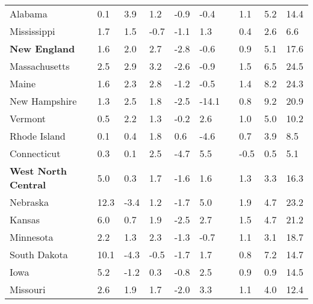 {\begin{tabular}{p{29mm} R{8.5mm} R{8.5mm} R{8.5mm} R{8.5mm} 
             R{8.5mm} p{0mm} R{11mm} R{11mm} R{12mm} }
\hspace{3mm}  Alabama  & 0.1 & 3.9 & 1.2 & -0.9 & -0.4 &  & 1.1 & 5.2 & 14.4 \\
\hspace{3mm}  Mississippi  & 1.7 & 1.5 & -0.7 & -1.1 & 1.3 &  & 0.4 & 2.6 & 6.6 \\
\hspace{1mm} \textbf{New England}  & 1.6 & 2.0 & 2.7 & -2.8 & -0.6 &  & 0.9 & 5.1 & 17.6 \\
\hspace{3mm}  Massachusetts  & 2.5 & 2.9 & 3.2 & -2.6 & -0.9 &  & 1.5 & 6.5 & 24.5 \\
\hspace{3mm}  Maine  & 1.6 & 2.3 & 2.8 & -1.2 & -0.5 &  & 1.4 & 8.2 & 24.3 \\
\hspace{3mm}  New Hampshire  & 1.3 & 2.5 & 1.8 & -2.5 & -14.1 &  & 0.8 & 9.2 & 20.9 \\
\hspace{3mm}  Vermont  & 0.5 & 2.2 & 1.3 & -0.2 & 2.6 &  & 1.0 & 5.0 & 10.2 \\
\hspace{3mm}  Rhode Island  & 0.1 & 0.4 & 1.8 & 0.6 & -4.6 &  & 0.7 & 3.9 & 8.5 \\
\hspace{3mm}  Connecticut  & 0.3 & 0.1 & 2.5 & -4.7 & 5.5 &  & -0.5 & 0.5 & 5.1 \\
\hspace{1mm} \textbf{West North Central}  & 5.0 & 0.3 & 1.7 & -1.6 & 1.6 &  & 1.3 & 3.3 & 16.3 \\
\hspace{3mm}  Nebraska  & 12.3 & -3.4 & 1.2 & -1.7 & 5.0 &  & 1.9 & 4.7 & 23.2 \\
\hspace{3mm}  Kansas  & 6.0 & 0.7 & 1.9 & -2.5 & 2.7 &  & 1.5 & 4.7 & 21.2 \\
\hspace{3mm}  Minnesota  & 2.2 & 1.3 & 2.3 & -1.3 & -0.7 &  & 1.1 & 3.1 & 18.7 \\
\hspace{3mm}  South Dakota  & 10.1 & -4.3 & -0.5 & -1.7 & 1.7 &  & 0.8 & 7.2 & 14.7 \\
\hspace{3mm}  Iowa  & 5.2 & -1.2 & 0.3 & -0.8 & 2.5 &  & 0.9 & 0.9 & 14.5 \\
\hspace{3mm}  Missouri  & 2.6 & 1.9 & 1.7 & -2.0 & 3.3 &  & 1.1 & 4.0 & 12.4 \\

\end{tabular}}
